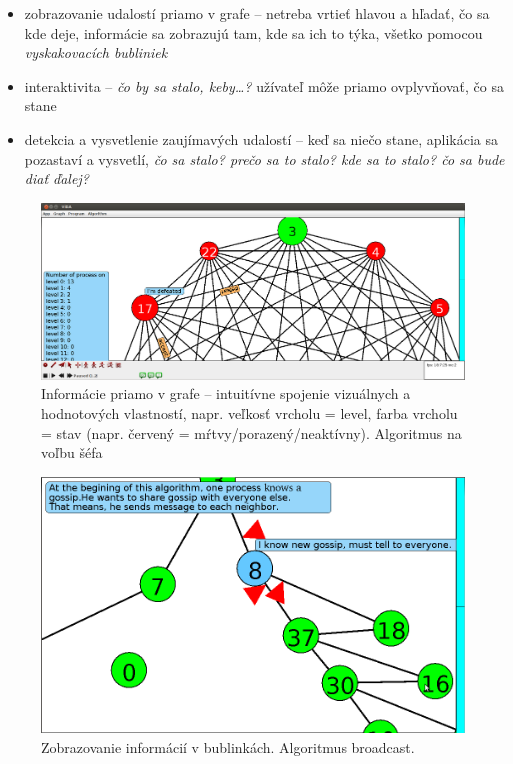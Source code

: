 
\begin{itemize}
    \item zobrazovanie udalostí priamo v grafe -- netreba vrtieť hlavou a hľadať, čo sa kde deje,
    informácie sa zobrazujú tam, kde sa ich to týka, všetko pomocou \emph{vyskakovacích bubliniek}
    \item interaktivita -- \emph{čo by sa stalo, keby\dots?} užívateľ môže priamo ovplyvňovať, čo sa
    stane
    \item detekcia a vysvetlenie zaujímavých udalostí -- keď sa niečo stane, aplikácia sa pozastaví
    a vysvetlí, 
    \emph{čo sa stalo? prečo sa to stalo? kde sa to stalo? čo sa bude diať ďalej?}
\end{itemize}

\begin{figure}
\includegraphics[width=\columnwidth]{le}
\vspace{-1cm}
\caption{Informácie priamo v grafe -- intuitívne spojenie vizuálnych a hodnotových
vlastností, napr. veľkosť vrcholu = level, farba vrcholu = stav (napr. červený =
mŕtvy/porazený/neaktívny). Algoritmus na voľbu šéfa}
\end{figure}


\begin{figure}
\vspace{-1cm}
\includegraphics[width=\columnwidth]{bfs}
\vspace{-1cm}
\caption{Zobrazovanie informácií v bublinkách. Algoritmus broadcast.}
\vspace{-1cm}
\end{figure}


